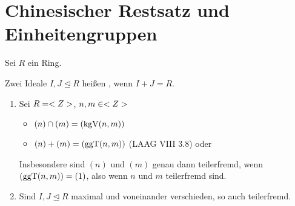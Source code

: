 \section{Chinesischer Restsatz und Einheitengruppen}

Sei $R$ ein Ring.

\begin{definition}[teilerfremd]
	Zwei Ideale $I,J \unlhd R$ heißen , wenn $I+J = R$.
\end{definition}

\begin{example}
	\begin{enumerate}[label=(\alph*)]
		\item Sei $R = <Z>$, $n,m \in <Z>$
			\begin{itemize}
				\item $(n) \cap (m) = (\operatorname{kgV}(n,m))$
				\item $(n) + (m) = (\operatorname{ggT}(n,m))$ (LAAG VIII 3.8) oder 
			\end{itemize}
		Insbesondere sind $(n)$ und $(m)$ genau dann teilerfremd, wenn $(\operatorname{ggT}(n,m)) = (1)$, also wenn $n$ und $m$ teilerfremd sind.
		\item Sind $I,J \unlhd R$ maximal und voneinander verschieden, so auch teilerfremd.
	\end{enumerate}
\end{example}

